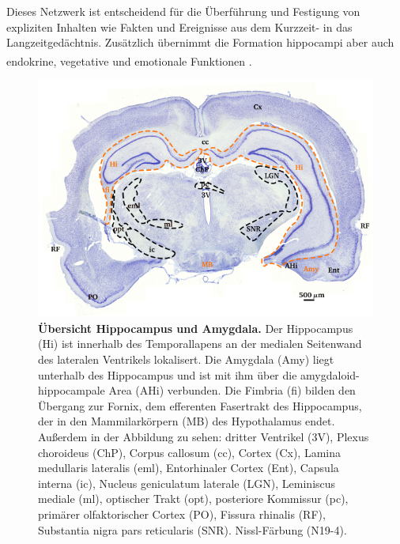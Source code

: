 \documentclass[12pt,a4paper,pdftex]{article}
\begin{document}
Dieses Netzwerk ist entscheidend für die Überführung und Festigung von expliziten Inhalten wie Fakten und Ereignisse aus dem Kurzzeit- in das Langzeitgedächtnis. Zusätzlich übernimmt die Formation hippocampi aber auch endokrine, vegetative und emotionale Funktionen \textsuperscript{\cite[9]{trepel2011neuroanatomie}}. 

\begin{figure}[H]
    \centering
    \includegraphics{pictures/Basalganglia/Hippo_uebersicht.png}
    \caption[Übersicht Hippocampus und Amygdala]{\textbf{Übersicht Hippocampus und Amygdala.} Der Hippocampus (Hi) ist innerhalb des Temporallapens an der medialen Seitenwand des lateralen Ventrikels lokalisert. Die Amygdala (Amy) liegt unterhalb des Hippocampus und ist mit ihm über die amygdaloid-hippocampale Area (AHi) verbunden. Die Fimbria (fi) bilden den Übergang zur Fornix, dem efferenten Fasertrakt des Hippocampus, der in den Mammilarkörpern (MB) des Hypothalamus endet. Außerdem in der Abbildung zu sehen: dritter Ventrikel (3V), Plexus choroideus (ChP), Corpus callosum (cc), Cortex (Cx), Lamina medullaris lateralis (eml), Entorhinaler Cortex (Ent), Capsula interna (ic), Nucleus geniculatum laterale (LGN), Leminiscus mediale (ml), optischer Trakt (opt), posteriore Kommissur (pc), primärer  olfaktorischer  Cortex (PO), Fissura rhinalis (RF), Substantia nigra pars reticularis (SNR). Nissl-Färbung (N19-4).}
    \label{fig:hippo_uebersicht}
\end{figure}
\end{document}
